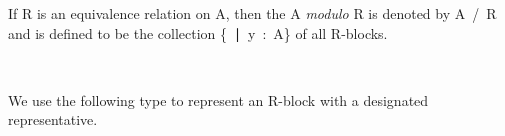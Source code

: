 If \ab R is an equivalence relation on \ab A, then the  \ab A \textit{modulo} \ab R is denoted by \ab A~\af /~\ab R and is defined to be the collection \{\af [~\ab u~\af ]~∣~\ab y~\as :~\ab A\} of all \ab R-blocks.
\ccpad
\begin{code}%
\>[0][@{}l@{\AgdaIndent{1}}]%
\>[1]\AgdaOperator{\AgdaFunction{\AgdaUnderscore{}/\AgdaUnderscore{}}}\AgdaSpace{}%
\AgdaSymbol{:}\AgdaSpace{}%
\AgdaSymbol{(}\AgdaSpace{}%
\AgdaSymbol{:}\AgdaSpace{}%
\AgdaSpace{}%
\AgdaSpace{}%
\AgdaSymbol{)}\AgdaSpace{}%
\AgdaSpace{}%
\AgdaSpace{}%
\AgdaSpace{}%
\AgdaSpace{}%
\AgdaSpace{}%
\AgdaSpace{}%
\AgdaSpace{}%
\AgdaSymbol{(}\AgdaSpace{}%
\AgdaSymbol{)}\AgdaSpace{}%
\<%
\\
%
\>[1]\AgdaSpace{}%
\AgdaOperator{\AgdaFunction{/}}\AgdaSpace{}%
\AgdaSpace{}%
\AgdaSymbol{=}\AgdaSpace{}%
\AgdaSpace{}%
\AgdaSpace{}%
\AgdaSpace{}%
\AgdaSpace{}%
\AgdaSpace{}%
\AgdaSpace{}%
\AgdaFunction{,}\AgdaSpace{}%
\AgdaSpace{}%
\AgdaSpace{}%
\AgdaSymbol{\{}\AgdaSymbol{\}}\<%
\end{code}
\ccpad
We use the following type to represent an \ab R-block with a designated representative.
\ccpad
\begin{code}%
\>[0][@{}l@{\AgdaIndent{1}}]%
\>[1]\AgdaSpace{}%
\AgdaSymbol{:}\AgdaSpace{}%
\AgdaSymbol{\{}\AgdaSpace{}%
\AgdaSymbol{:}\AgdaSpace{}%
\AgdaSpace{}%
\AgdaSymbol{\}}\AgdaSpace{}%
\AgdaSpace{}%
\AgdaSpace{}%
\AgdaSpace{}%
\AgdaSymbol{\{}\AgdaSpace{}%
\AgdaSymbol{:}\AgdaSpace{}%
\AgdaSpace{}%
\AgdaSpace{}%
\AgdaSymbol{\}}\AgdaSpace{}%
\AgdaSpace{}%
\AgdaSpace{}%
\AgdaOperator{\AgdaFunction{/}}\AgdaSpace{}%
\<%
\\
%
\>[1]\AgdaSpace{}%
\AgdaSpace{}%
\AgdaSpace{}%
\AgdaSymbol{\{}\AgdaSymbol{\}}\AgdaSpace{}%
\AgdaSymbol{=}\AgdaSpace{}%
\AgdaOperator{\AgdaFunction{[}}\AgdaSpace{}%
\AgdaSpace{}%
\AgdaOperator{\AgdaFunction{]}}\AgdaSpace{}%
\AgdaSpace{}%
\AgdaOperator{\AgdaInductiveConstructor{,}}\AgdaSpace{}%
\AgdaSymbol{(}%
\>[27]\AgdaOperator{\AgdaInductiveConstructor{,}}\AgdaSpace{}%
\AgdaSymbol{)}\<%
\end{code}
